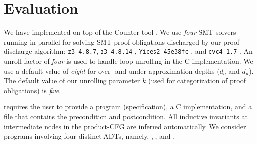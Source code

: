 \section{Evaluation}
\label{sec:syn-eval}



We have implemented \toolName{} on top of the
Counter tool \cite{oopsla20}.
We use {\em four} SMT solvers running in parallel for solving
SMT proof obligations discharged by our proof discharge algorithm:
{\tt z3-4.8.7}, {\tt z3-4.8.14} \cite{z3},
{\tt Yices2-45e38fc} \cite{yices},
and {\tt cvc4-1.7} \cite{cvc4solver}.
An unroll factor of {\em four} is used to handle loop unrolling in the C implementation.
We use a default value of {\em eight} for
over- and under-approximation depths ($d_o$ and $d_u$).
The default value of
our unrolling parameter $k$ (used for categorization of proof obligations) is {\em five}.

\toolName{} requires the user to provide a \SpecL{} program (specification), a C implementation,
and a file that contains the precondition and postcondition. All inductive invariants
at intermediate nodes in the product-CFG are inferred automatically.
We consider programs involving four distinct ADTs, namely,
 ,  ,  
and  .


